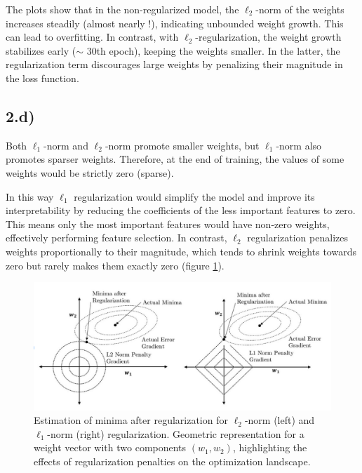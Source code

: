 \documentclass[a4paper, 12pt]{article}
\begin{document}
The plots show that in the non-regularized model, the $\ell_2$-norm of the weights increases steadily (almost nearly !), indicating unbounded weight growth. This can lead to overfitting. In contrast, with $\ell_2$-regularization, the weight growth stabilizes early ($\sim$ 30th epoch), keeping the weights smaller. In the latter, the regularization term discourages large weights by penalizing their magnitude in the loss function.

\subsection*{2.d)}

Both $\ell_1$-norm and $\ell_2$-norm promote smaller weights, but $\ell_1$-norm also promotes sparser weights. Therefore, at the end of training, the values of some weights would be strictly zero (sparse).

In this way $\ell_1$ regularization would simplify the model and improve its interpretability by reducing the coefficients of the less important features to zero. This means only the most important features would have non-zero weights, effectively performing feature selection. In contrast, $\ell_2$ regularization penalizes weights proportionally to their magnitude, which tends to shrink weights towards zero but rarely makes them exactly zero (figure \ref{fig:l1_vs_l2}).
\begin{figure}[H]
    \centering
    \includegraphics[width=0.7\linewidth]{plot/l1_vs_ls.png}
    \caption{Estimation of minima after regularization for \(\ell_2\)-norm (left) and \(\ell_1\)-norm (right) regularization. Geometric representation for a weight vector with two components \((w_1, w_2)\), highlighting the effects of regularization penalties on the optimization landscape. \cite{inbook}}
    \label{fig:l1_vs_l2}
\end{figure}
\end{document}
